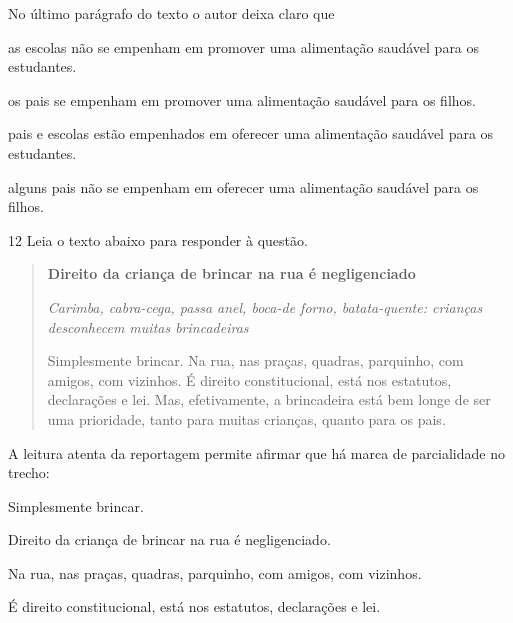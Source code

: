 
No último parágrafo do texto o autor deixa claro que

\begin{escolha}
    
    \item as escolas não se empenham em promover uma alimentação saudável para os
  estudantes.
    
    \item os pais se empenham em promover uma alimentação saudável para os
  filhos.
    
    \item pais e escolas estão empenhados em oferecer uma alimentação saudável para
  os estudantes.
    
    \item alguns pais não se empenham em oferecer uma alimentação saudável para os filhos.

\end{escolha}

\num{12} Leia o texto abaixo para responder à questão. 

\begin{quote}

\textbf{Direito da criança de brincar na rua é negligenciado}

\emph{Carimba, cabra-cega, passa anel, boca-de forno, batata-quente:
crianças desconhecem muitas brincadeiras}

Simplesmente brincar. Na rua, nas praças, quadras, parquinho, com
amigos, com vizinhos. É direito constitucional, está nos estatutos,
declarações e lei. Mas, efetivamente, a brincadeira está bem longe de
ser uma prioridade, tanto para muitas crianças, quanto para os pais.

\end{quote}


A leitura atenta da reportagem permite afirmar que há marca de parcialidade
no trecho:

\begin{escolha}
  
    \item Simplesmente brincar.
  
    \item Direito da criança de brincar na rua é negligenciado.
  
    \item Na rua, nas praças, quadras, parquinho, com amigos, com vizinhos.
  
    \item É direito constitucional, está nos estatutos, declarações e lei.

\end{escolha}

